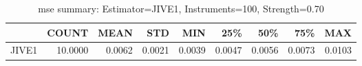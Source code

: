 \begin{table}[ht]
\centering
\caption{mse summary: Estimator=JIVE1, Instruments=100, Strength=0.70}
\begin{tabular}{lrrrrrrrr}
\toprule
 & COUNT & MEAN & STD & MIN & 25\% & 50\% & 75\% & MAX \\
\midrule
JIVE1 & 10.0000 & 0.0062 & 0.0021 & 0.0039 & 0.0047 & 0.0056 & 0.0073 & 0.0103 \\
\bottomrule
\end{tabular}
\end{table}
